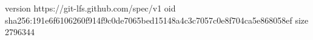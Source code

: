 version https://git-lfs.github.com/spec/v1
oid sha256:191e6f6106260f914f9c0de7065bed15148a4c3c7057c0e8f704ca5e868058ef
size 2796344
